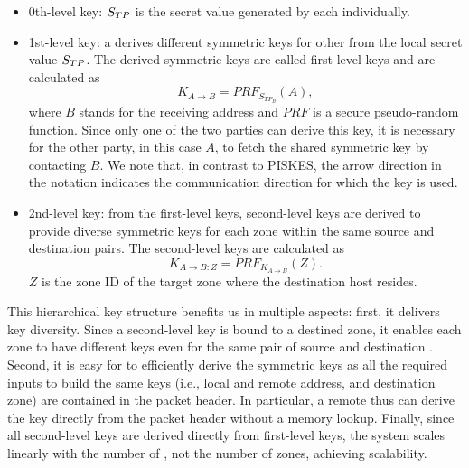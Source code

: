 \begin{itemize}
	\item 0th-level key: $S_{TP}$ is the secret value generated by each \tp individually.
	\item 1st-level key: a \tp derives different symmetric keys for other \tps from the
	      local secret value $S_{TP}$. The derived symmetric keys are called first-level keys and 
	      are calculated as
	      \begin{equation}
	      	K_{A \rightarrow B} = PRF_{S_{{TP}_B}}(A),
	      	\label{eq:1stkey}
	      \end{equation}
	      where $B$ stands for the receiving \tp address and $PRF$ is a secure pseudo-random 
	      function. Since only one of the two parties can derive this key, it is necessary for 
	      the other party, in this case $A$, to fetch the shared symmetric key by contacting 
	      $B$. We note that, in contrast to PISKES, the arrow direction
	      in the notation indicates the communication direction for which the key is used.
	\item 2nd-level key: from the first-level keys, second-level keys are derived to
	      provide diverse symmetric keys for each zone within the same source and destination 
	      \tp pairs. The second-level keys are calculated as
	      \begin{equation}
	      	K_{A \rightarrow B:Z} = PRF_{K_{A \rightarrow B}}(Z).
	      	\label{eq:2ndkey}
	      \end{equation}
	      $Z$ is the zone ID of the target zone where the destination host resides. 
\end{itemize}

This hierarchical key structure benefits us in multiple aspects: first, it delivers
key diversity. Since a second-level key is bound to a destined zone, it enables 
each zone to have different keys even for the same pair of source and destination \tps. 
Second, it is easy for \tps to efficiently derive the symmetric keys as all the
required inputs to build the same keys (i.e., local and remote \tp address, and 
destination zone) are contained in the packet header. In particular, a remote \tp 
thus can derive the key directly from the packet header without a memory lookup. 
Finally, since all second-level keys are derived directly from first-level keys, 
the system scales linearly with the number of \tps, not the number of zones, achieving scalability.

